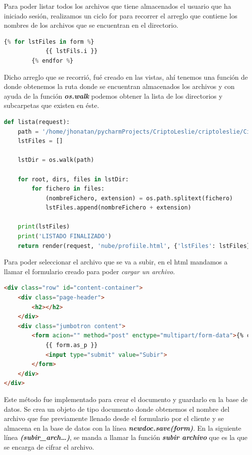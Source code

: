 Para poder listar todos los archivos que tiene almacenados el usuario que ha iniciado sesión, realizamos un ciclo for para recorrer el arreglo que contiene los nombres de los archivos que se encuentran en el directorio.

\begin{lstlisting}[language=Python,frame=single, keywordstyle=\color{blue},breaklines=true]
		{% for lstFiles in form %}
			{{ lstFils.i }}
		{% endfor %}
\end{lstlisting}

Dicho arreglo que se recorrió, fué creado en las vistas, ahí tenemos una función de donde obtenemos la ruta donde se encuentran almacenados los archivos y con ayuda de la función \textbf{\textit{os.walk}} podemos obtener la lista de los directorios y subcarpetas que existen en éste.

\begin{lstlisting}[language=Python,frame=single, keywordstyle=\color{blue},breaklines=true, showstringspaces=false]
def lista(request):
	path = '/home/jhonatan/pycharmProjects/CriptoLeslie/criptoleslie/Cifrados/'
	lstFiles = []

	lstDir = os.walk(path) 

	for root, dirs, files in lstDir:
		for fichero in files:
			(nombreFichero, extension) = os.path.splitext(fichero)
			lstFiles.append(nombreFichero + extension)

	print(lstFiles)
	print('LISTADO FINALIZADO')
	return render(request, 'nube/profiile.html', {'lstFiles': lstFiles})
\end{lstlisting}

Para poder seleccionar el archivo que se va a subir, en el html mandamos a llamar el formulario creado para poder \textit{cargar un archivo}.

\begin{lstlisting}[language=HTML,frame=single, keywordstyle=\color{blue},breaklines=true]
<div class="row" id="content-container">
	<div class="page-header">
		<h2></h2>
	</div>
	<div class="jumbotron content">
		<form acion="" method="post" enctype="multipart/form-data">{% csrf_token %}
			{{ form.as_p }}
			<input type="submit" value="Subir">
		</form>
	</div>
</div>
\end{lstlisting}


Este método fue implementado para crear el documento y guardarlo en la base de datos. Se crea un objeto de tipo documento donde obtenemos el nombre del archivo que fue previamente llenado desde el formulario por el cliente y se almacena en la base de datos con la línea \textbf{\textit{newdoc.save(form)}}.
En la siguiente línea \textbf{\textit{(subir\_arch…)}}, se manda a llamar la función \textbf{\textit{subir archivo}} que es la que se encarga de cifrar el archivo.

